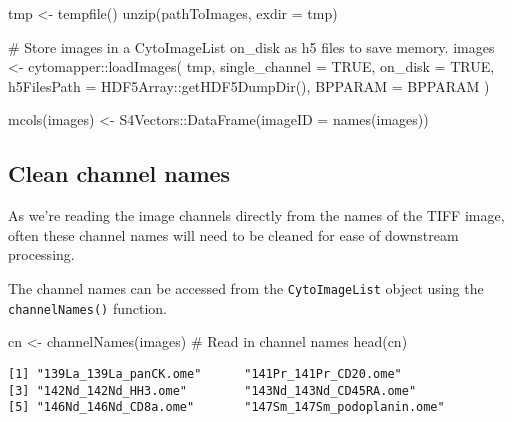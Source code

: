 \documentclass[
  letterpaper,
  DIV=11,
  numbers=noendperiod]{scrreprt}
\newenvironment{Shaded}{\begin{snugshade}}{\end{snugshade}}
\newcommand{\AttributeTok}[1]{\textcolor[rgb]{0.40,0.45,0.13}{#1}}
\newcommand{\CommentTok}[1]{\textcolor[rgb]{0.37,0.37,0.37}{#1}}
\newcommand{\ConstantTok}[1]{\textcolor[rgb]{0.56,0.35,0.01}{#1}}
\newcommand{\FunctionTok}[1]{\textcolor[rgb]{0.28,0.35,0.67}{#1}}
\newcommand{\NormalTok}[1]{\textcolor[rgb]{0.00,0.23,0.31}{#1}}
\newcommand{\OtherTok}[1]{\textcolor[rgb]{0.00,0.23,0.31}{#1}}
\newcommand{\SpecialCharTok}[1]{\textcolor[rgb]{0.37,0.37,0.37}{#1}}
\begin{document}
\begin{Shaded}
\begin{Highlighting}[]
\NormalTok{tmp }\OtherTok{\textless{}{-}} \FunctionTok{tempfile}\NormalTok{()}
\FunctionTok{unzip}\NormalTok{(pathToImages, }\AttributeTok{exdir =}\NormalTok{ tmp)}

\CommentTok{\# Store images in a CytoImageList on\_disk as h5 files to save memory.}
\NormalTok{images }\OtherTok{\textless{}{-}}\NormalTok{ cytomapper}\SpecialCharTok{::}\FunctionTok{loadImages}\NormalTok{(}
\NormalTok{  tmp,}
  \AttributeTok{single\_channel =} \ConstantTok{TRUE}\NormalTok{,}
  \AttributeTok{on\_disk =} \ConstantTok{TRUE}\NormalTok{,}
  \AttributeTok{h5FilesPath =}\NormalTok{ HDF5Array}\SpecialCharTok{::}\FunctionTok{getHDF5DumpDir}\NormalTok{(),}
  \AttributeTok{BPPARAM =}\NormalTok{ BPPARAM}
\NormalTok{)}

\FunctionTok{mcols}\NormalTok{(images) }\OtherTok{\textless{}{-}}\NormalTok{ S4Vectors}\SpecialCharTok{::}\FunctionTok{DataFrame}\NormalTok{(}\AttributeTok{imageID =} \FunctionTok{names}\NormalTok{(images))}
\end{Highlighting}
\end{Shaded}

\subsection{Clean channel names}\label{clean-channel-names}

As we're reading the image channels directly from the names of the TIFF
image, often these channel names will need to be cleaned for ease of
downstream processing.

The channel names can be accessed from the \texttt{CytoImageList} object
using the \texttt{channelNames()} function.

\begin{Shaded}
\begin{Highlighting}[]
\NormalTok{cn }\OtherTok{\textless{}{-}} \FunctionTok{channelNames}\NormalTok{(images) }\CommentTok{\# Read in channel names}
\FunctionTok{head}\NormalTok{(cn)}
\end{Highlighting}
\end{Shaded}

\begin{verbatim}
[1] "139La_139La_panCK.ome"      "141Pr_141Pr_CD20.ome"      
[3] "142Nd_142Nd_HH3.ome"        "143Nd_143Nd_CD45RA.ome"    
[5] "146Nd_146Nd_CD8a.ome"       "147Sm_147Sm_podoplanin.ome"
\end{verbatim}
\end{document}
